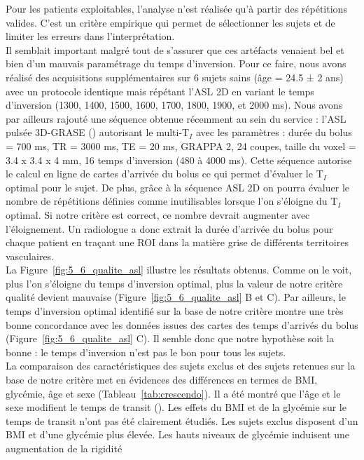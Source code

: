 Pour les patients exploitables, l’analyse n’est réalisée qu’à partir des répétitions valides. C’est un
critère empirique qui permet de sélectionner les sujets et de limiter les erreurs dans l’interprétation.\\
Il semblait important malgré tout de s’assurer que ces artéfacts venaient bel et bien d’un mauvais
paramétrage du temps d’inversion. Pour ce faire, nous avons réalisé des acquisitions supplémentaires
sur 6 sujets sains (âge = 24.5 ± 2 ans) avec un protocole identique mais répétant l’ASL 2D en variant le
temps d’inversion (1300, 1400, 1500, 1600, 1700, 1800, 1900, et 2000 ms). Nous avons par ailleurs
rajouté une séquence obtenue récemment au sein du service : l’ASL pulsée 3D-GRASE (\cite{Gunther2005}) autorisant
le multi-T$_I$ avec les paramètres : durée du bolus = 700 ms, TR = 3000 ms, TE = 20 ms, GRAPPA 2, 24
coupes, taille du voxel = 3.4 x 3.4 x 4 mm, 16 temps d’inversion (480 à 4000 ms). Cette séquence
autorise le calcul en ligne de cartes d’arrivée du bolus ce qui permet d’évaluer le T$_I$ optimal pour le
sujet. De plus, grâce à la séquence ASL 2D on pourra évaluer le nombre de répétitions définies comme
inutilisables lorsque l’on s’éloigne du T$_I$ optimal. Si notre critère est correct, ce nombre devrait
augmenter avec l’éloignement. Un radiologue a donc extrait la durée d’arrivée du bolus pour chaque
patient en traçant une ROI dans la matière grise de différents territoires vasculaires.\\
La Figure~\ref{fig:5_6_qualite_asl} illustre les résultats obtenus. Comme on le voit, plus l’on s’éloigne du temps
d’inversion optimal, plus la valeur de notre critère qualité devient mauvaise (Figure~\ref{fig:5_6_qualite_asl} B et C). Par
ailleurs, le temps d’inversion optimal identifié sur la base de notre critère montre une très bonne
concordance avec les données issues des cartes des temps d’arrivés du bolus (Figure~\ref{fig:5_6_qualite_asl} C). Il semble
donc que notre hypothèse soit la bonne : le temps d’inversion n’est pas le bon pour tous les sujets.\\
La comparaison des caractéristiques des sujets exclus et des sujets retenues sur la base de notre
critère met en évidences des différences en termes de BMI, glycémie, âge et sexe (Tableau~\ref{tab:crescendo}). Il a été
montré que l’âge et le sexe modifient le temps de transit (\cite{Liu2012}). Les effets du BMI et de la glycémie sur
le temps de transit n’ont pas été clairement étudiés. Les sujets exclus disposent d’un BMI et d’une
glycémie plus élevée. Les hauts niveaux de glycémie induisent une augmentation de la rigidité
